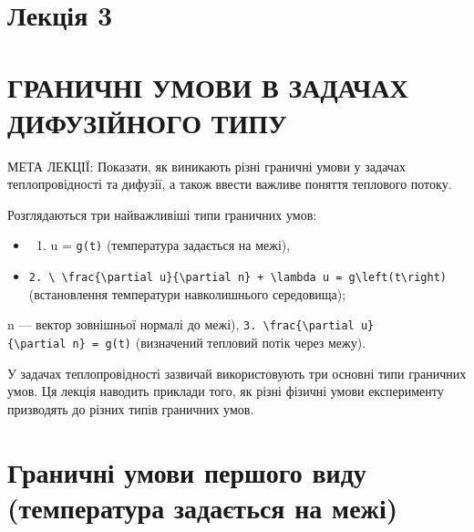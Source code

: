 \documentclass[
  ukrainian,
]{article}
\providecommand{\tightlist}{%
  \setlength{\itemsep}{0pt}\setlength{\parskip}{0pt}}
\begin{document}
\section{Лекція 3}\label{ux43bux435ux43aux446ux456ux44f-3}

\section{ГРАНИЧНІ УМОВИ В ЗАДАЧАХ ДИФУЗІЙНОГО
ТИПУ}\label{ux433ux440ux430ux43dux438ux447ux43dux456-ux443ux43cux43eux432ux438-ux432-ux437ux430ux434ux430ux447ux430ux445-ux434ux438ux444ux443ux437ux456ux439ux43dux43eux433ux43e-ux442ux438ux43fux443}

МЕТА ЛЕКЦІЇ: Показати, як виникають різні граничні умови у задачах
теплопровідності та дифузії, а також ввести важливе поняття теплового
потоку.

Розглядаються три найважливіші типи граничних умов:

\begin{itemize}
\tightlist
\item
  \begin{enumerate}
  \def\labelenumi{\arabic{enumi}.}
  \tightlist
  \item
    u = \texttt{g(t)} (температура задається на межі),
  \end{enumerate}
\item
  \texttt{2.\ \textbackslash{}\ \textbackslash{}frac\{\textbackslash{}partial\ u\}\{\textbackslash{}partial\ n\}\ +\ \textbackslash{}lambda\ u\ =\ g\textbackslash{}left(t\textbackslash{}right)}
  (встановлення температури навколишнього середовища);
\end{itemize}

n --- вектор зовнішньої нормалі до межі),
\texttt{3.\ \textbackslash{}frac\{\textbackslash{}partial\ u\}\{\textbackslash{}partial\ n\}\ =\ g(t)}
(визначений тепловий потік через межу).

У задачах теплопровідності зазвичай використовують три основні типи
граничних умов. Ця лекція наводить приклади того, як різні фізичні умови
експерименту призводять до різних типів граничних умов.

\section{Граничні умови першого виду (температура задається на
межі)}\label{ux433ux440ux430ux43dux438ux447ux43dux456-ux443ux43cux43eux432ux438-ux43fux435ux440ux448ux43eux433ux43e-ux432ux438ux434ux443-ux442ux435ux43cux43fux435ux440ux430ux442ux443ux440ux430-ux437ux430ux434ux430ux454ux442ux44cux441ux44f-ux43dux430-ux43cux435ux436ux456}
\end{document}
